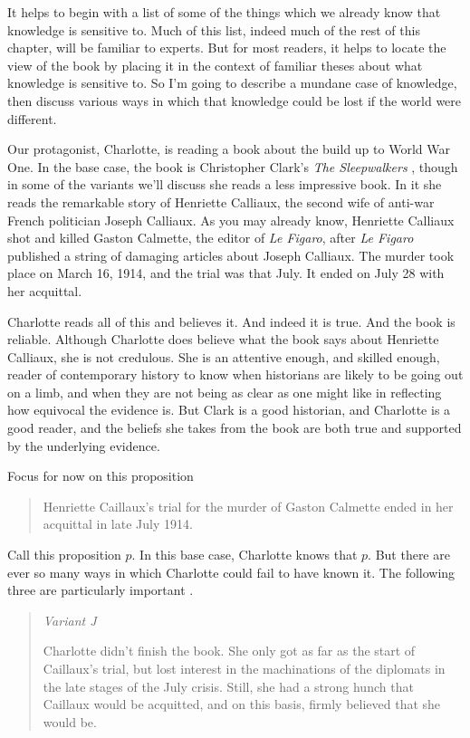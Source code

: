 \documentclass[11pt,]{book}
\begin{document}
It helps to begin with a list of some of the things which we already know that knowledge is sensitive to. Much of this list, indeed much of the rest of this chapter, will be familiar to experts. But for most readers, it helps to locate the view of the book by placing it in the context of familiar theses about what knowledge is sensitive to. So I'm going to describe a mundane case of knowledge, then discuss various ways in which that knowledge could be lost if the world were different.

Our protagonist, Charlotte, is reading a book about the build up to World War One. In the base case, the book is Christopher Clark's \emph{The Sleepwalkers} \citep{Clark2012}, though in some of the variants we'll discuss she reads a less impressive book. In it she reads the remarkable story of Henriette Calliaux, the second wife of anti-war French politician Joseph Calliaux. As you may already know, Henriette Calliaux shot and killed Gaston Calmette, the editor of \emph{Le Figaro}, after \emph{Le Figaro} published a string of damaging articles about Joseph Calliaux. The murder took place on March 16, 1914, and the trial was that July. It ended on July 28 with her acquittal.

Charlotte reads all of this and believes it. And indeed it is true. And the book is reliable. Although Charlotte does believe what the book says about Henriette Calliaux, she is not credulous. She is an attentive enough, and skilled enough, reader of contemporary history to know when historians are likely to be going out on a limb, and when they are not being as clear as one might like in reflecting how equivocal the evidence is. But Clark is a good historian, and Charlotte is a good reader, and the beliefs she takes from the book are both true and supported by the underlying evidence.

Focus for now on this proposition

\begin{quote}
Henriette Caillaux's trial for the murder of Gaston Calmette ended in her acquittal in late July 1914.
\end{quote}

Call this proposition \(p\). In this base case, Charlotte knows that \(p\). But there are ever so many ways in which Charlotte could fail to have known it. The following three are particularly important .

\begin{quote}
\emph{Variant J}

Charlotte didn't finish the book. She only got as far as the start of Caillaux's trial, but lost interest in the machinations of the diplomats in the late stages of the July crisis. Still, she had a strong hunch that Caillaux would be acquitted, and on this basis, firmly believed that she would be.
\end{quote}
\end{document}
